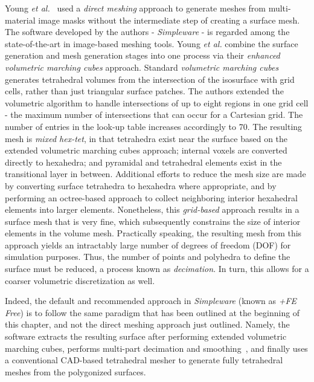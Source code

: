 Young \textit{et al.}~\cite{young_2008} used a \textit{direct meshing} approach to generate meshes from multi-material image masks without the intermediate step of creating a surface mesh. The software developed by the authors - \textit{Simpleware} - is regarded among the state-of-the-art in image-based meshing tools. Young \textit{et al.} combine the surface generation and mesh generation stages into one process via their \textit{enhanced volumetric marching cubes} approach. Standard \textit{volumetric marching cubes} generates tetrahedral volumes from the intersection of the isosurface with grid cells, rather than just triangular surface patches. The authors extended the volumetric algorithm to handle intersections of up to eight regions in one grid cell - the maximum number of intersections that can occur for a Cartesian grid. The number of entries in the look-up table increases accordingly to 70. The resulting mesh is \textit{mixed hex-tet}, in that tetrahedra exist near the surface based on the extended volumetric marching cubes approach; internal voxels are converted directly to hexahedra; and pyramidal and tetrahedral elements exist in the transitional layer in between. Additional efforts to reduce the mesh size are made by converting surface tetrahedra to hexahedra where appropriate, and by performing an octree-based approach to collect neighboring interior hexahedral elements into larger elements. Nonetheless, this \textit{grid-based} approach results in a surface mesh that is very fine, which subsequently constrains the size of interior elements in the volume mesh. Practically speaking, the resulting mesh from this approach yields an intractably large number of degrees of freedom (DOF) for simulation purposes. Thus, the number of points and polyhedra to define the surface must be reduced, a process known as \textit{decimation}. In turn, this allows for a coarser volumetric discretization as well.

Indeed, the default and recommended approach in \textit{Simpleware} (known as \textit{+FE Free}) is to follow the same paradigm that has been outlined at the beginning of this chapter, and not the direct meshing approach just outlined. Namely, the software extracts the resulting surface after performing extended volumetric marching cubes, performs multi-part decimation and smoothing~\cite{egst}, and finally uses a conventional CAD-based tetrahedral mesher to generate fully tetrahedral meshes from the polygonized surfaces.


